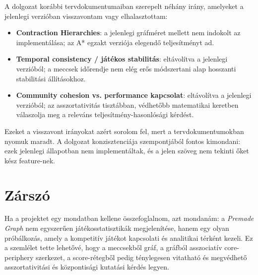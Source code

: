﻿\documentclass[a4paper,12pt]{report}
\begin{document}
A dolgozat korábbi tervdokumentumaiban szerepelt néhány irány, amelyeket a jelenlegi verzióban visszavontam vagy elhalasztottam:

\begin{itemize}
    \item \textbf{Contraction Hierarchies}: a jelenlegi gráfméret mellett nem indokolt az implementálása; az A* egzakt verziója elegendő teljesítményt ad.
    \item \textbf{Temporal consistency / játékos stabilitás}: eltávolítva a jelenlegi verzióból; a meccsek időrendje nem elég erős módszertani alap hosszanti stabilitási állításokhoz.
    \item \textbf{Community cohesion vs. performance kapcsolat}: eltávolítva a jelenlegi verzióból; az asszortativitás tisztábban, védhetőbb matematikai keretben válaszolja meg a releváns teljesítmény-hasonlósági kérdést.

\end{itemize}

Ezeket a visszavont irányokat azért sorolom fel, mert a tervdokumentumokban nyomuk maradt. A dolgozat konzisztenciája szempontjából fontos kimondani: ezek jelenlegi állapotban nem implementáltak, és a jelen szöveg nem tekinti őket kész feature-nek.

\section{Zárszó}

Ha a projektet egy mondatban kellene összefoglalnom, azt mondanám: a \emph{Premade Graph} nem egyszerűen játékosstatisztikák megjelenítése, hanem egy olyan próbálkozás, amely a kompetitív játékot kapcsolati és analitikai térként kezeli. Ez a szemlélet tette lehetővé, hogy a meccsekből gráf, a gráfból asszociatív core-periphery szerkezet, a score-rétegből pedig ténylegesen vitatható és megvédhető asszortativitási és központisági kutatási kérdés legyen.
\end{document}
